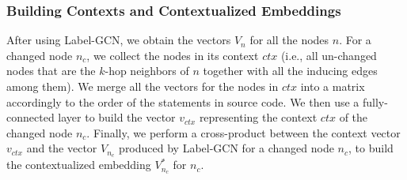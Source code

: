 

\subsubsection{Building Contexts and Contextualized Embeddings}
After using Label-GCN, we obtain the vectors $V_n$ for all the nodes
$n$. For a changed node $n_c$, we collect the nodes in its context
$ctx$ (i.e., all un-changed nodes that are the $k$-hop neighbors of $n$
together with all the inducing edges among them). We merge all the
vectors for the nodes in $ctx$ into a matrix accordingly to the order
of the statements in source code. We then use a fully-connected layer
to build the vector $v_{ctx}$ representing the context $ctx$ of the
changed node $n_c$.
%
Finally, we perform a cross-product between the context vector $v_{ctx}$ and
the vector $V_{n_c}$ produced by Label-GCN for a changed node $n_c$, to
build the contextualized embedding $V^{*}_{n_c}$ for $n_c$.


